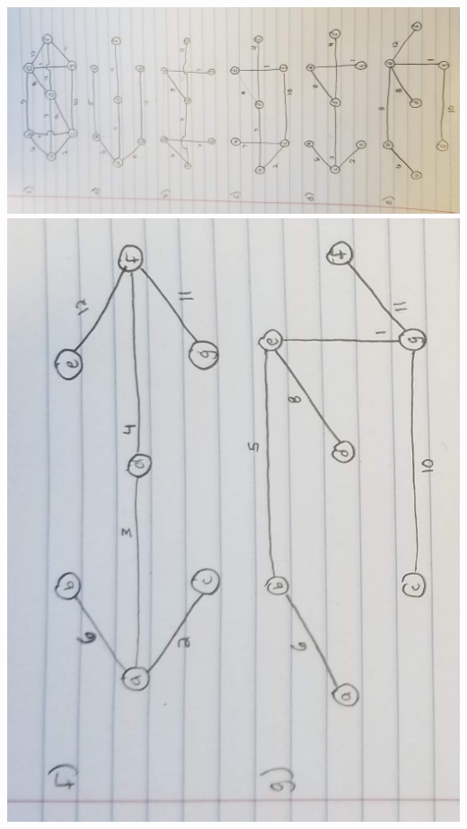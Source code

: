 \documentclass[12pt]{article}
\begin{document}
\begin{enumerate}
\includegraphics[scale=0.08]{problem3pic1.png}
\includegraphics[scale=0.08]{problem3pic2.png}

\end{enumerate}
\end{document}
